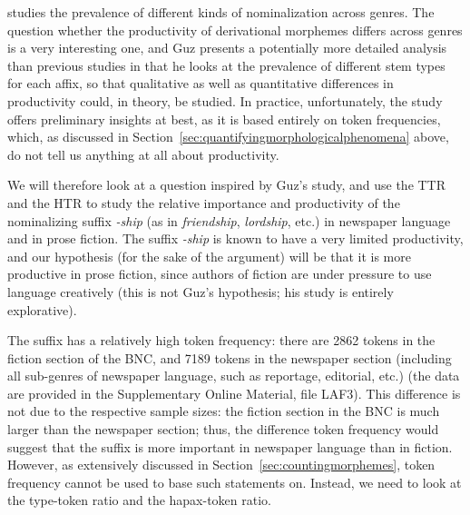 \citet{guz_english_2009} studies the prevalence of different kinds of nominalization across genres.  The question whether the productivity  of derivational morphemes  differs across genres is a very interesting one, and Guz presents a potentially more detailed analysis than previous studies in that he looks at the prevalence of different stem  types  for each affix,  so that qualitative as well as quantitative differences in productivity could, in theory, be studied. In practice, unfortunately, the study offers preliminary insights at best, as it is based entirely on token  frequencies,  which, as discussed in Section~\ref{sec:quantifyingmorphologicalphenomena} above, do not tell us anything at all about  productivity.

We will therefore look at a question inspired by Guz's study, and use the TTR  and the HTR  to study the relative importance and productivity  of the nominalizing  suffix  \textit{-ship} (as in \textit{friendship}, \textit{lordship}, etc.) in newspaper  language and in prose fiction.  The suffix  \textit{-ship} is known to have a very limited productivity, and our hypothesis (for the sake of the argument) will be that it is more productive  in prose fiction, since authors of fiction are under pressure to use language creatively (this is not Guz's hypothesis; his study is entirely explorative).

The suffix  has a relatively high token  frequency:  there are 2862 tokens in the fiction  section of the BNC,  and 7189 tokens in the newspaper  section (including all sub\hyp{}genres  of newspaper language, such as reportage, editorial, etc.) (the data are provided in the Supplementary Online Material, file LAF3). This difference is not due to the respective sample sizes:  the fiction section in the BNC  is much larger than the newspaper section; thus, the difference token frequency  would suggest that the suffix  is more important in newspaper  language than in fiction.  However, as extensively discussed in Section~\ref{sec:countingmorphemes}, token frequency  cannot be used to base such statements on. Instead, we need to look at the type\hyp{}token ratio  and the hapax\hyp{}token  ratio.

